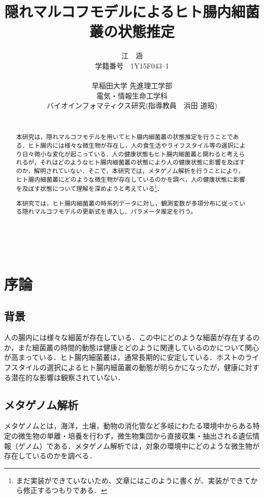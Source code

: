 \documentclass[dvipdfmx,autodetect-engine]{jsreport}
\title{隠れマルコフモデルによるヒト腸内細菌叢の状態推定}
\author{江　涵\\
学籍番号　1Y15F043–1\\
\\
早稲田大学 先進理工学部\\
電気・情報生命工学科\\ 
バイオインフォマティクス研究(指導教員　浜田 道昭)\\
\\

}
\begin{document}
\maketitle

\begin{abstract}

本研究は，隠れマルコフモデルを用いてヒト腸内細菌叢の状態推定を行うことである．ヒト腸内には様々な微生物が存在し，人の食生活やライフスタイル等の選択により日々微小な変化が起こっている．人の健康状態もヒト腸内細菌叢と関わると考えられるが，それはどのようなヒト腸内細菌叢の状態により人の健康状態に影響を及ぼすのか，解明されていない．そこで，本研究では，メタゲノム解析を行うことにより，ヒト腸内細菌叢にどのような微生物が存在しているのかを調べ，人の健康状態に影響を及ぼす状態について理解を深めようと考えている\footnote{まだ実装ができていないため、文章にはこのように書くが、実装ができてから修正するつもりである．}．

本研究では，ヒト腸内細菌叢の時系列データに対し，観測変数が多項分布に従っている隠れマルコフモデルの更新式を導入し、パラメータ推定を行う。
\end{abstract}



\setcounter{tocdepth}{2}　%
\tableofcontents


\chapter{序論}

\section{背景}

人の腸内には様々な細菌が存在している．この中にどのような細菌が存在するのか，また細菌叢の時間的動態は健康とどのように関連しているのかについて関心が高まっている\cite{pmid20368178}\cite{pmid21885731}．ヒト腸内細菌叢は，通常長期的に安定している\cite{pmid23828941}\cite{pmid9758810}．ホストのライフスタイルの選択によるヒト腸内細菌叢の動態が明らかになった\cite{pmid25146375}が，健康に対する潜在的な影響は観察されていない．


\section{メタゲノム解析}

メタゲノムとは，海洋，土壌，動物の消化管など多岐にわたる環境中からある特定の微生物の単離・培養を行わず，微生物集団から直接収集・抽出される遺伝情報（ゲノム）である．メタゲノム解析では，対象の環境中にどのような微生物が存在しているのかを調べる．
\end{document}
